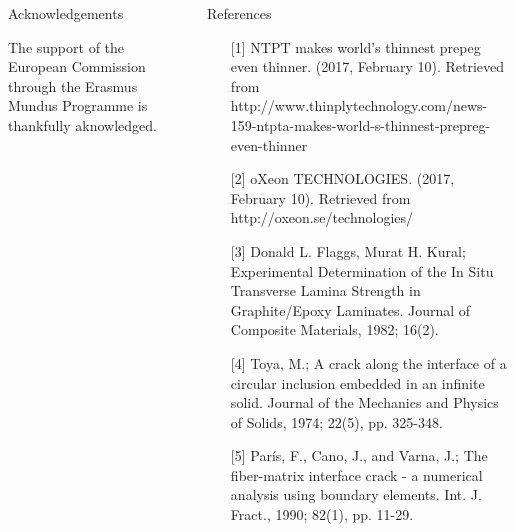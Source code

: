 \documentclass[final]{beamer}
\begin{document}
\begin{frame}

\begin{center}
\begin{minipage}{\textwidth}
\begin{columns}[totalwidth=0.925\textwidth]
\begin{column}{0.45\textwidth}
\begin{block}{\rule[-0.6ex]{0pt}{50pt}\centering Acknowledgements}
\centering\scriptsize The support of the European Commission through the Erasmus Mundus Programme is thankfully aknowledged.
\end{block}
\end{column}
\begin{column}{0.45\textwidth}
\begin{block}{\rule[-0.6ex]{0pt}{50pt}\centering References}
\centering
\tiny
\begin{enumerate}
\item[{[}1{]}] NTPT makes world's thinnest prepeg even thinner. (2017, February 10). Retrieved from http://www.thinplytechnology.com/news-159-ntpta-makes-world-s-thinnest-prepreg-even-thinner
\item[{[}2{]}] oXeon TECHNOLOGIES. (2017, February 10). Retrieved from http://oxeon.se/technologies/
\item[{[}3{]}] Donald L. Flaggs, Murat H. Kural; Experimental Determination of the In Situ Transverse Lamina Strength in Graphite/Epoxy Laminates.  Journal of Composite Materials, 1982; 16(2).
\item[{[}4{]}] Toya, M.; A crack along the interface of a circular inclusion embedded in an infinite solid. Journal of the Mechanics and Physics of Solids, 1974; 22(5), pp. 325-348.
\item[{[}5{]}] Par\'is, F., Cano, J., and Varna, J.; The fiber-matrix interface crack - a numerical analysis using boundary elements. Int. J. Fract., 1990; 82(1), pp. 11-29.
\end{enumerate}
\end{block}
\end{column}
\end{columns}
\end{minipage}
\end{center}

\end{frame}
\end{document}
